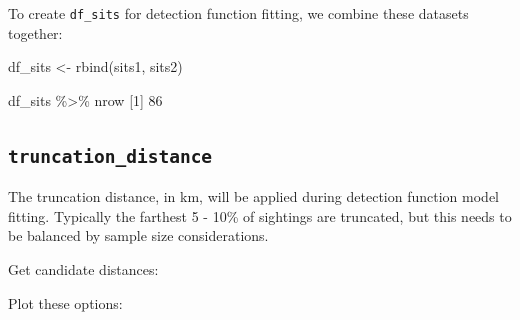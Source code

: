 \documentclass[
]{book}
\newenvironment{Shaded}{\begin{snugshade}}{\end{snugshade}}
\newcommand{\AttributeTok}[1]{\textcolor[rgb]{0.77,0.63,0.00}{#1}}
\newcommand{\DecValTok}[1]{\textcolor[rgb]{0.00,0.00,0.81}{#1}}
\newcommand{\FloatTok}[1]{\textcolor[rgb]{0.00,0.00,0.81}{#1}}
\newcommand{\FunctionTok}[1]{\textcolor[rgb]{0.00,0.00,0.00}{#1}}
\newcommand{\NormalTok}[1]{#1}
\newcommand{\OtherTok}[1]{\textcolor[rgb]{0.56,0.35,0.01}{#1}}
\newcommand{\SpecialCharTok}[1]{\textcolor[rgb]{0.00,0.00,0.00}{#1}}
\newcommand{\StringTok}[1]{\textcolor[rgb]{0.31,0.60,0.02}{#1}}
\begin{document}
To create \texttt{df\_sits} for detection function fitting, we combine these datasets together:

\begin{Shaded}
\begin{Highlighting}[]
\NormalTok{df\_sits }\OtherTok{\textless{}{-}} \FunctionTok{rbind}\NormalTok{(sits1, sits2)}

\NormalTok{df\_sits }\SpecialCharTok{\%\textgreater{}\%}\NormalTok{ nrow}
\NormalTok{[}\DecValTok{1}\NormalTok{] }\DecValTok{86}
\end{Highlighting}
\end{Shaded}

\hypertarget{truncation_distance}{%
\subsection*{\texorpdfstring{\texttt{truncation\_distance}}{truncation\_distance}}\label{truncation_distance}}

The truncation distance, in km, will be applied during detection function model fitting. Typically the farthest 5 - 10\% of sightings are truncated, but this needs to be balanced by sample size considerations.

Get candidate distances:

\begin{Shaded}
\end{Shaded}

Plot these options:

\begin{Shaded}
\end{Shaded}
\end{document}
